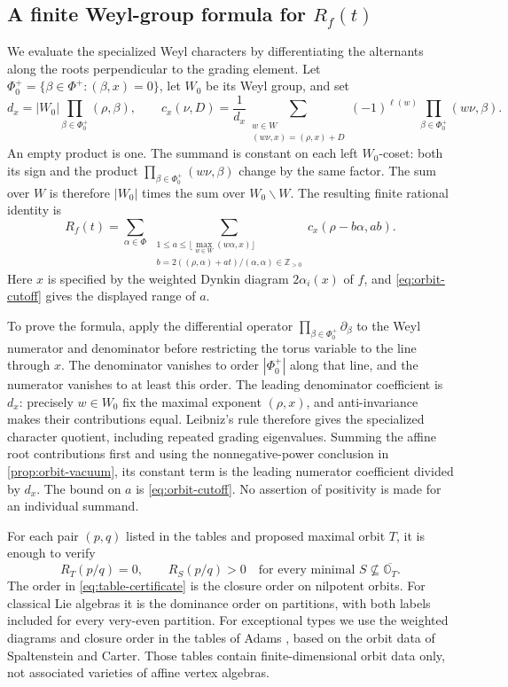 \documentclass[11pt,a4paper]{amsart}
\numberwithin{equation}{section}
\theoremstyle{definition}
\theoremstyle{remark}
\newcommand{\Z}{\mathbb Z}
\newcommand{\OO}{\mathbb O}
\begin{document}
\subsection{A finite Weyl-group formula for \texorpdfstring{$R_f(t)$}{Rf(t)}}\label{cert:weyl-certificate}
We evaluate the specialized Weyl characters by differentiating the
alternants along the roots perpendicular to the grading element.
Let $\Phi_0^+=\{\beta\in\Phi^+:(\beta,x)=0\}$, let $W_0$ be its
Weyl group, and set
$$
 d_x=|W_0|\prod_{\beta\in\Phi_0^+}(\rho,\beta),\qquad
 c_x(\nu,D)=\frac1{d_x}
 \sum_{\substack{w\in W\\(w\nu,x)=(\rho,x)+D}}
 (-1)^{\ell(w)}\prod_{\beta\in\Phi_0^+}(w\nu,\beta).
$$
An empty product is one. The summand is constant on each left
$W_0$-coset: both its sign and the product $\prod_{\beta\in\Phi_0^+}(w\nu,\beta)$ change by the same factor. The sum over $W$ is therefore $|W_0|$ times the sum over
$W_0\backslash W$.
The resulting finite rational identity is
\begin{equation}\label{eq:finite-weyl-certificate}
 R_f(t)=\sum_{\alpha\in\Phi}\ \sum_{\substack{
 1\le a\le\lfloor\max_{w\in W}(w\alpha,x)\rfloor\\
 b=2((\rho,\alpha)+at)/(\alpha,\alpha)\in\Z_{>0}}}
 c_x(\rho-b\alpha,ab).
\end{equation}
Here $x$ is specified by the weighted Dynkin diagram $2\alpha_i(x)$
of $f$, and \eqref{eq:orbit-cutoff} gives the displayed range of $a$.

To prove the formula, apply the differential operator
$\prod_{\beta\in\Phi_0^+}\partial_\beta$ to the Weyl numerator and
denominator before restricting the torus variable to the line through
$x$. The denominator vanishes to order $|\Phi_0^+|$ along that line,
and the numerator vanishes to at least this order.
The leading denominator coefficient is $d_x$: precisely $w\in W_0$
fix the maximal exponent $(\rho,x)$, and anti-invariance makes their
contributions equal. Leibniz's rule therefore gives the specialized
character quotient, including repeated grading eigenvalues. Summing the
affine root contributions first and using the nonnegative-power conclusion in
\cref{prop:orbit-vacuum}, its constant term is the leading numerator
coefficient divided by $d_x$. The bound on $a$ is \eqref{eq:orbit-cutoff}.
No assertion of positivity is made for an individual summand.

For each pair $(p,q)$ listed in the tables and proposed maximal orbit $T$,
it is enough to verify
\begin{equation}\label{eq:table-certificate}
 R_T(p/q)=0,\qquad R_S(p/q)>0
 \quad\text{for every minimal }S\not\subseteq\overline{\OO_T}.
\end{equation}
The order in \eqref{eq:table-certificate} is the closure order on
nilpotent orbits. For classical Lie algebras it is the dominance order
on partitions, with both labels included for every very-even partition.
For exceptional types we use the weighted diagrams and closure order
in the tables of Adams \cite{AdamsOrbitTables}, based on the orbit data
of Spaltenstein and Carter. Those tables
contain finite-dimensional orbit data only, not associated varieties of affine vertex algebras.
\end{document}
